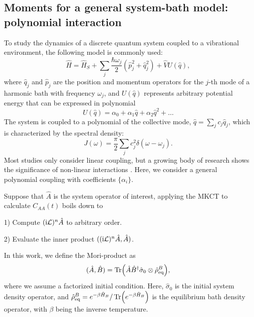 \documentclass[preprint,aip,jcp]{revtex4-2}
\newcommand{\im}{\textup{i}}
\newcommand{\Lv}{\mathcal{L}}
\begin{document}
\subsection{Moments for a general system-bath model: polynomial interaction\label{subsec:poly}}
To study the dynamics of a discrete quantum system coupled to a vibrational environment, the following model is commonly used: 
\begin{equation}\label{eqn:H_sys_bath_lin}
    \hat{H} = \hat{H}_S + \sum_j \frac{\hbar\omega_j}{2} (\hat{p}_j^2 + \hat{q}_j^2) + \hat{V} U(\hat{q}),
\end{equation}
where ${\hat{q}_j}$ and $\hat{p}_j$ are the position and momentum operators for the $j$-th mode of a harmonic bath with frequency $\omega_j$, and $U(\hat{q})$ represents arbitrary potential energy that can be expressed in polynomial
\begin{equation}\label{eqn:poly}
    U(\hat{q}) = \alpha_0 + \alpha_1 \hat{q} + \alpha_2 \hat{q}^2 + \dots
\end{equation}
The system is coupled to a polynomial of the collective mode, $\hat{q} = \sum_j c_j \hat{q}_j$, which is characterized by the spectral density: 
\begin{equation}\label{eqn:spec_den}
    J(\omega) = \frac{\pi}{2} \sum_j c_j^2 \delta(\omega - \omega_j).
\end{equation} 
Most studies only consider linear coupling, but a growing body of research shows the significance of non-linear interactions \cite{Xu2018Nonlinear,Zhang2020nonlinear,Chen2023Quad,Han2024quad,Bi2024quad}. Here, we consider a general polynomial coupling with coefficients $\{\alpha_i\}$.

Suppose that $\hat{A}$ is the system operator of interest, applying the MKCT to calculate $C_{AA}(t)$ boils down to \begin{enumerate*}
    \item[1)] Compute $(\im\Lv)^n \hat{A}$ to arbitrary order.
    \item[2)] Evaluate the inner product $((\im\Lv)^n \hat{A}, \hat{A})$.
\end{enumerate*} 
In this work, we define the Mori-product as 
\begin{equation}\label{eqn:mori_product}
    (\hat{A}, \hat{B}) = \Tr(\hat{A} \hat{B}^{\dagger} \hat{\sigma}_0 \otimes \hat{\rho}_\text{eq}^{B}), 
\end{equation}
where we assume a factorized initial condition. Here, $\hat{\sigma}_0$  is the initial system density operator, and $\hat{\rho}_\text{eq}^{B} = e^{-\beta \hat{H}_B}/ \Tr(e^{-\beta \hat{H}_B})$ is the equilibrium bath density operator, with $\beta$ being the inverse temperature.
\end{document}
